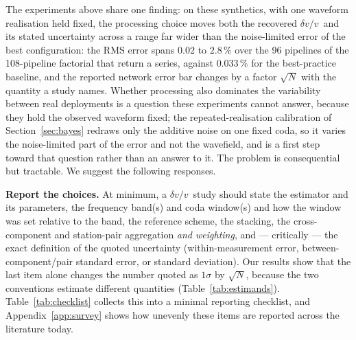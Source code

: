 \documentclass[
  referee]{gji}
\providecommand{\dvv}{\ensuremath{\delta v/v}}
\begin{document}
The experiments above share one finding: on these synthetics, with one
waveform realisation held fixed, the processing choice moves both the
recovered \dvv~and its stated uncertainty across a range far wider than
the noise-limited error of the best configuration: the RMS error spans
\(0.02\) to \(2.8\,\%\) over the 96 pipelines of the 108-pipeline
factorial that return a series, against \(0.033\,\%\) for the
best-practice baseline, and the reported network error bar changes by a
factor \(\sqrt{N}\) with the quantity a study names. Whether processing
also dominates the variability between real deployments is a question
these experiments cannot answer, because they hold the observed waveform
fixed; the repeated-realisation calibration of Section~\ref{sec:bayes}
redraws only the additive noise on one fixed coda, so it varies the
noise-limited part of the error and not the wavefield, and is a first
step toward that question rather than an answer to it. The problem is
consequential but tractable. We suggest the following responses.

\textbf{Report the choices.} At minimum, a \dvv~study should state the
estimator and its parameters, the frequency band(s) and coda window(s)
and how the window was set relative to the band, the reference scheme,
the stacking, the cross-component and station-pair aggregation \emph{and
weighting}, and --- critically --- the exact definition of the quoted
uncertainty (within-measurement error, between-component/pair standard
error, or standard deviation). Our results show that the last item alone
changes the number quoted as \(1\sigma\) by \(\sqrt{N}\), because the
two conventions estimate different quantities
(Table~\ref{tab:estimands}). Table~\ref{tab:checklist} collects this
into a minimal reporting checklist, and Appendix~\ref{app:survey} shows
how unevenly these items are reported across the literature today.
\end{document}
